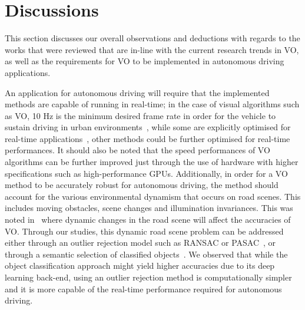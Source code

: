 
\section{Discussions}\label{sec:3:discuss}
This section discusses our overall observations and deductions with regards to the works that were reviewed that are in-line with the current research trends in VO, as well as the requirements for VO to be implemented in autonomous driving applications.  

An application for autonomous driving will require that the implemented methods are capable of running in real-time; in the case of visual algorithms such as VO, 10 Hz is the minimum desired frame rate in order for the vehicle to sustain driving in urban environments~\cite{bojarski_end_2016}, while some are explicitly optimised for real-time applications~\cite{jaimez_fast_2017,holzmann_detailed_2016}, other methods could be further optimised for real-time performances. It should also be noted that the speed performances of VO algorithms can be further improved just through the use of hardware with higher specifications such as high-performance GPUs. Additionally, in order for a VO method to be accurately robust for autonomous driving, the method should account for the various environmental dynamism that occurs on road scenes. This includes moving obstacles, scene changes and illumination invariances. This was noted in~\cite{an_semantic_2017,kim_effective_2016} where dynamic changes in the road scene will affect the accuracies of VO. Through our studies, this dynamic road scene problem can be addressed either through an outlier rejection model such as RANSAC or PASAC~\cite{liu_robust_2017}, or through a semantic selection of classified objects~\cite{an_semantic_2017}. We observed that while the object classification approach might yield higher accuracies due to its deep learning back-end, using an outlier rejection method is computationally simpler and it is more capable of the real-time performance required for autonomous driving.

